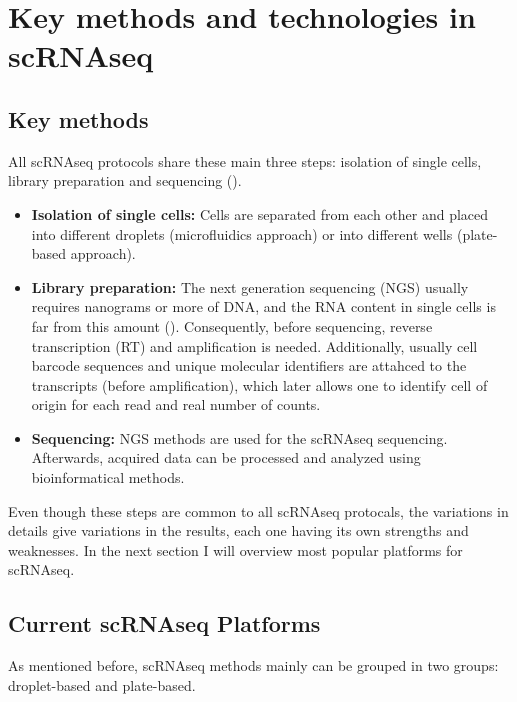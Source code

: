 \iffalse
\section{Key methods and technologies in scRNAseq}

\subsection{Key methods}

All scRNAseq protocols share these main three steps:
isolation of single cells, library preparation and sequencing (\cite{Andrews2018}).

\begin{itemize}
  \item \textbf{Isolation of single cells:} Cells are separated from each other
  and placed into different droplets (microfluidics approach)
  or into different wells (plate-based approach).
  \item \textbf{Library preparation:} The next generation sequencing (NGS) usually requires nanograms or more of DNA,
  and the RNA content in single cells is far from this amount (\cite{Wu2017}).
  Consequently, before sequencing, reverse transcription (RT) and amplification is needed.
  Additionally, usually cell barcode sequences and unique molecular identifiers are attahced to the transcripts (before amplification),
  which later allows one to identify cell of origin for each read and real number of counts.
  \item \textbf{Sequencing:} NGS methods are used for the scRNAseq sequencing.
  Afterwards, acquired data can be processed and analyzed using bioinformatical methods.
\end{itemize}

Even though these steps are common to all scRNAseq protocals,
the variations in details give variations in the results, each one having its own strengths and weaknesses.
In the next section I will overview most popular platforms for scRNAseq.

\subsection{Current scRNAseq Platforms}

As mentioned before, scRNAseq methods mainly can be grouped in two groups: droplet-based and plate-based.

